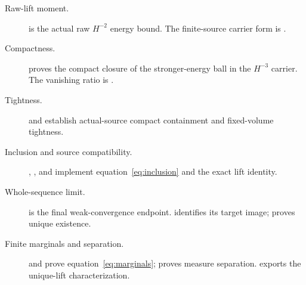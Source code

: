 \documentclass[11pt]{amsart}
\theoremstyle{remark}\newtheorem{remark}[theorem]{Remark}
\begin{document}
\begin{description}
\item[Raw-lift moment.]
 is the actual raw $H^{-2}$ energy bound. The finite-source carrier form is .
\item[Compactness.]
 proves the compact closure of the stronger-energy ball in the $H^{-3}$ carrier. The vanishing ratio is .
\item[Tightness.]
 and  establish actual-source compact containment and fixed-volume tightness.
\item[Inclusion and source compatibility.]
, , and  implement equation~\eqref{eq:inclusion} and the exact lift identity.
\item[Whole-sequence limit.]
 is the final weak-convergence endpoint.  identifies its target image;  proves unique existence.
\item[Finite marginals and separation.]
 and  prove equation~\eqref{eq:marginals};  proves measure separation.  exports the unique-lift characterization.
\end{description}
\end{document}
